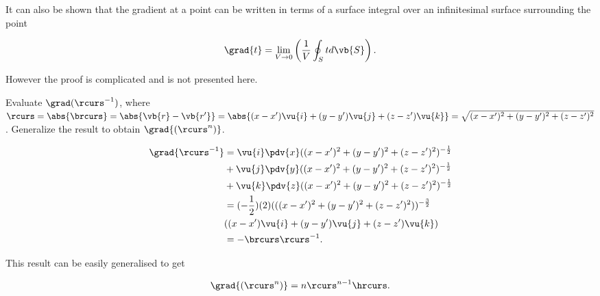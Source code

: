\documentclass[english,a4paper,12pt]{report}
\begin{document}
It can also be shown that the gradient at a point can be written in terms of a surface integral over an infinitesimal surface surrounding the point

\begin{equation}
	\grad{t } = \lim_{V \to 0} \left( \frac{1}{V} \oint_{S} t  d\vb{S}  \right).
\end{equation}

However the proof is complicated and is not presented here.

{Evaluate \(\grad({\rcurs ^{-1} })\), where \(\rcurs = \abs{\brcurs} = \abs{\vb{r} - \vb{r'}} = \abs{(x - x')\vu{i} + (y - y')\vu{j} + (z - z')\vu{k}} = \sqrt{(x-x')^2+(y-y')^2+(z-z')^2}\). Generalize the result to obtain \(\grad{(\rcurs^n)}\).}
{\begin{equation} 
	\begin{aligned} 
		\grad{\rcurs ^{-1} } &= \vu{i}\pdv{x}((x - x')^2 + (y - y')^2 + (z - z')^2)^{-\frac{1}{2}} \\ &+ \vu{j}\pdv{y}((x - x')^2 + (y - y')^2 + (z - z')^2)^{-\frac{1}{2}} \\ &+ \vu{k}\pdv{z}((x - x')^2 + (y - y')^2 + (z - z')^2)^{-\frac{1}{2}} \\ &= (-\frac{1}{2})(2)(((x - x')^2 + (y - y')^2 + (z - z')^2))^{-\frac{3}{2}} \\ &((x - x')\vu{i} + (y - y')\vu{j} + (z - z')\vu{k}) \\ &=- \brcurs \rcurs ^{-1} . 
	\end{aligned} 
\end{equation}
		
This result can be easily generalised to get
		
\begin{equation} 
	\grad{(\rcurs^n)} = n\rcurs^{n-1}\hrcurs. \label{gradrcurs} 
\end{equation}}
\end{document}
